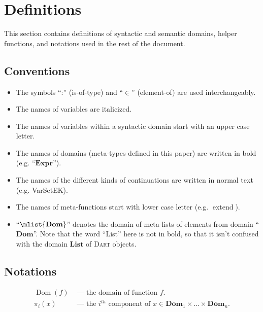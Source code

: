 \documentclass[a4paper,oneside,fleqn]{article}
\newcommand{\dart}{\textsc{Dart}}
\DeclareMathOperator{\dom}{Dom} %
\DeclareMathOperator{\extend}{extend}
\newcommand{\dexpr}{\mathbf{Expr}}
\newcommand{\ddom}{\mathbf{Dom}}    %
\newcommand{\dsemlist}{\mathbf{List}}
\begin{document}
\section{Definitions}
\label{sec:definitions}

This section contains definitions of syntactic and semantic domains, helper functions, and notations used in the rest of the document.


\subsection{Conventions}
\label{subsec:conventions}

\begin{itemize}
    \item The symbols ``:'' (is-of-type) and ``$\in$'' (element-of) are used interchangeably.
    \item The names of variables are italicized.
    \item The names of variables within a syntactic domain start with an upper case letter.
    \item The names of domains (meta-types defined in this paper) are written in bold (e.g. ``$\dexpr$'').
    \item The names of the different kinds of continuations are written in normal text (e.g. VarSetEK).
    \item The names of meta-functions start with lower case letter (e.g. $\extend$).
    \item ``$\mlist{\ddom}$'' denotes the domain of meta-lists of elements from domain ``$\ddom$''.
        Note that the word ``List'' here is not in bold, so that it isn't confused with the domain $\dsemlist$ of \dart{} objects.
\end{itemize}

\subsection{Notations}
\label{subsec:notations}

\begin{align*}
    \dom(f) &\text{ --- the domain of function \(f\)}.\\
    \pi_i(x) &\text{ --- the $i^{th}$ component of $x \in \ddom_1 \times \dots \times \ddom_n$}.
\end{align*}
\end{document}
